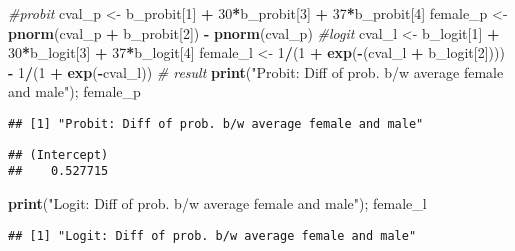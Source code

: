 \documentclass[
  12pt,
]{article}
\newenvironment{Shaded}{\begin{snugshade}}{\end{snugshade}}
\newcommand{\CommentTok}[1]{\textcolor[rgb]{0.56,0.35,0.01}{\textit{#1}}}
\newcommand{\DecValTok}[1]{\textcolor[rgb]{0.00,0.00,0.81}{#1}}
\newcommand{\KeywordTok}[1]{\textcolor[rgb]{0.13,0.29,0.53}{\textbf{#1}}}
\newcommand{\NormalTok}[1]{#1}
\newcommand{\OperatorTok}[1]{\textcolor[rgb]{0.81,0.36,0.00}{\textbf{#1}}}
\newcommand{\StringTok}[1]{\textcolor[rgb]{0.31,0.60,0.02}{#1}}
\begin{document}
\begin{Shaded}
\begin{Highlighting}[]
\CommentTok{\#probit}
\NormalTok{cval\_p \textless{}{-}}\StringTok{ }\NormalTok{b\_probit[}\DecValTok{1}\NormalTok{] }\OperatorTok{+}\StringTok{ }\DecValTok{30}\OperatorTok{*}\NormalTok{b\_probit[}\DecValTok{3}\NormalTok{] }\OperatorTok{+}\StringTok{ }\DecValTok{37}\OperatorTok{*}\NormalTok{b\_probit[}\DecValTok{4}\NormalTok{] }
\NormalTok{female\_p \textless{}{-}}\StringTok{ }\KeywordTok{pnorm}\NormalTok{(cval\_p }\OperatorTok{+}\StringTok{ }\NormalTok{b\_probit[}\DecValTok{2}\NormalTok{]) }\OperatorTok{{-}}\StringTok{ }\KeywordTok{pnorm}\NormalTok{(cval\_p)}
\CommentTok{\#logit}
\NormalTok{cval\_l \textless{}{-}}\StringTok{ }\NormalTok{b\_logit[}\DecValTok{1}\NormalTok{] }\OperatorTok{+}\StringTok{ }\DecValTok{30}\OperatorTok{*}\NormalTok{b\_logit[}\DecValTok{3}\NormalTok{] }\OperatorTok{+}\StringTok{ }\DecValTok{37}\OperatorTok{*}\NormalTok{b\_logit[}\DecValTok{4}\NormalTok{]}
\NormalTok{female\_l \textless{}{-}}\StringTok{ }\DecValTok{1}\OperatorTok{/}\NormalTok{(}\DecValTok{1} \OperatorTok{+}\StringTok{ }\KeywordTok{exp}\NormalTok{(}\OperatorTok{{-}}\NormalTok{(cval\_l }\OperatorTok{+}\StringTok{ }\NormalTok{b\_logit[}\DecValTok{2}\NormalTok{]))) }\OperatorTok{{-}}\StringTok{ }\DecValTok{1}\OperatorTok{/}\NormalTok{(}\DecValTok{1} \OperatorTok{+}\StringTok{ }\KeywordTok{exp}\NormalTok{(}\OperatorTok{{-}}\NormalTok{cval\_l)) }
\CommentTok{\# result}
\KeywordTok{print}\NormalTok{(}\StringTok{"Probit: Diff of prob. b/w average female and male"}\NormalTok{); female\_p}
\end{Highlighting}
\end{Shaded}

\begin{verbatim}
## [1] "Probit: Diff of prob. b/w average female and male"
\end{verbatim}

\begin{verbatim}
## (Intercept) 
##    0.527715
\end{verbatim}

\begin{Shaded}
\begin{Highlighting}[]
\KeywordTok{print}\NormalTok{(}\StringTok{"Logit: Diff of prob. b/w average female and male"}\NormalTok{); female\_l}
\end{Highlighting}
\end{Shaded}

\begin{verbatim}
## [1] "Logit: Diff of prob. b/w average female and male"
\end{verbatim}
\end{document}
